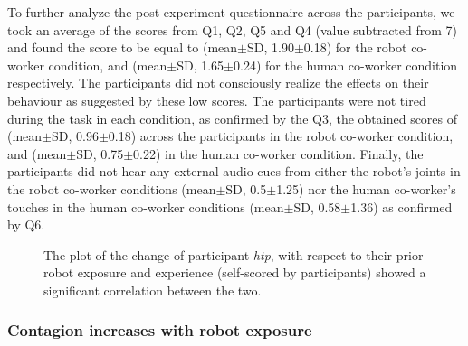 To further analyze the post-experiment questionnaire across the participants, we took an average of the scores from Q1, Q2, Q5 and Q4 (value subtracted from 7) and found the score to be equal to (mean$\pm$SD, 1.90$\pm$0.18) for the robot co-worker condition, and (mean$\pm$SD, 1.65$\pm$0.24) for the human co-worker condition respectively. The participants did not consciously realize the effects on their behaviour as suggested by these low scores. The participants were not tired during the task in each condition, as confirmed by the Q3, the obtained scores of (mean$\pm$SD, 0.96$\pm$0.18) across the participants in the robot co-worker condition, and (mean$\pm$SD, 0.75$\pm$0.22) in the human co-worker condition. Finally, the participants did not hear any external audio cues from either the robot's joints in the robot co-worker conditions (mean$\pm$SD, 0.5$\pm$1.25) nor the human co-worker's touches in the human co-worker conditions (mean$\pm$SD, 0.58$\pm$1.36) as confirmed by Q6.


\begin{figure}[hptb]
	\caption{The plot of the change of participant {\it htp}, with respect to their prior robot exposure and experience (self-scored by participants) showed a significant correlation between the two.}
	\label{fig:corelation}
\end{figure}


\subsubsection{Contagion increases with robot exposure}

